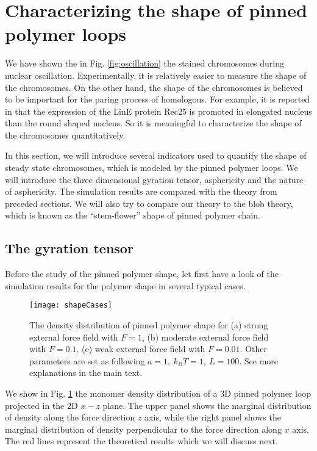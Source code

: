 \section{Characterizing the shape of pinned polymer loops}
\label{sec:characterizing_the_shape_of_pinned_polymer_loops}

We have shown the in Fig. \ref{fig:oscillation} the stained chromosomes during nuclear oscillation. Experimentally, it is relatively easier to measure the shape of the chromosomes. 
On the other hand, the shape of the chromosomes is believed to be important for the paring process of homologous. For example, it is reported in \cite{Chacon2016} that the expression of the LinE protein Rec25 is promoted in elongated nucleus than the round shaped nucleus. So it is meaningful to characterize the shape of the chromosomes quantitatively. 

In this section, we will introduce several indicators used to quantify the shape of steady state chromosomes, which is modeled by the pinned polymer loops. We will introduce the three dimensional gyration tensor, asphericity and the nature of asphericity. The simulation results are compared with the theory from preceded sections. We will also try to compare our theory to the blob theory, which is known as the ``stem-flower'' shape of pinned polymer chain. 


\subsection{The gyration tensor}
\label{sub:the_gyration_tensor}
Before the study of the pinned polymer shape, let first have a look of the simulation results for the polymer shape in several typical cases. 

\begin{figure}[htpb]
    \centering
    \texttt{[image: shapeCases]}
    \caption{The density distribution of pinned polymer shape for (a) strong external force field with $F=1$, (b) moderate external force field with $F=0.1$, (c) weak external force field with $F=0.01$. Other parameters are set as following $a=1,~k_B T = 1,~L=100$. See more explanations in the main text.}
    \label{fig:shapeCases}
\end{figure}

We show in Fig. \ref{fig:shapeCases} the monomer density distribution of a 3D pinned polymer loop projected in the 2D $x-z$ plane. 
The upper panel shows the marginal distribution of density along the force direction $z$ axis, while the right panel shows the marginal distribution of density perpendicular to the force direction along $x$ axis. The red lines represent the theoretical results which we will discuss next.

